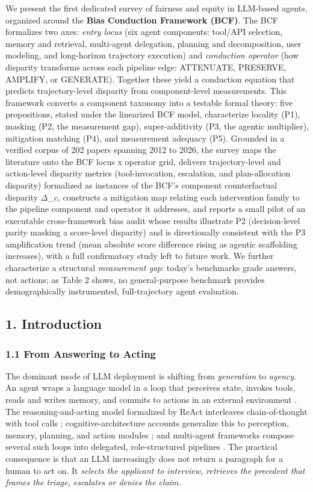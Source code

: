 \documentclass[10pt]{article}
\begin{document}
We present the first dedicated survey of fairness and equity in LLM-based agents, organized around the \textbf{Bias Conduction Framework (BCF)}. The BCF formalizes two axes: \emph{entry locus} (six agent components: tool/API selection, memory and retrieval, multi-agent delegation, planning and decomposition, user modeling, and long-horizon trajectory execution) and \emph{conduction operator} (how disparity transforms across each pipeline edge: ATTENUATE, PRESERVE, AMPLIFY, or GENERATE). Together these yield a conduction equation that predicts trajectory-level disparity from component-level measurements. This framework converts a component taxonomy into a testable formal theory: five propositions, stated under the linearized BCF model, characterize locality (P1), masking (P2, the measurement gap), super-additivity (P3, the agentic multiplier), mitigation matching (P4), and measurement adequacy (P5). Grounded in a verified corpus of 202 papers spanning 2012 to 2026, the survey maps the literature onto the BCF locus x operator grid, delivers trajectory-level and action-level disparity metrics (tool-invocation, escalation, and plan-allocation disparity) formalized as instances of the BCF's component counterfactual disparity $\Delta$\_c, constructs a mitigation map relating each intervention family to the pipeline component and operator it addresses, and reports a small pilot of an executable cross-framework bias audit whose results illustrate P2 (decision-level parity masking a score-level disparity) and is directionally consistent with the P3 amplification trend (mean absolute score difference rising as agentic scaffolding increases), with a full confirmatory study left to future work. We further characterize a structural \emph{measurement gap}: today's benchmarks grade answers, not actions; as Table 2 shows, no general-purpose benchmark provides demographically instrumented, full-trajectory agent evaluation.


\subsection*{1. Introduction}

\subsubsection*{1.1 From Answering to Acting}

The dominant mode of LLM deployment is shifting from \emph{generation} to \emph{agency}. An agent wraps a language model in a loop that perceives state, invokes tools, reads and writes memory, and commits to actions in an external environment \cite{wang2024survey,xi2023rise}. The reasoning-and-acting model formalized by ReAct interleaves chain-of-thought with tool calls \cite{yao2023react}; cognitive-architecture accounts generalize this to perception, memory, planning, and action modules \cite{sumers2024cognitive}; and multi-agent frameworks compose several such loops into delegated, role-structured pipelines \cite{wu2023autogen,park2023generative}. The practical consequence is that an LLM increasingly does not return a paragraph for a human to act on. It \emph{selects the applicant to interview, retrieves the precedent that frames the triage, escalates or denies the claim.}
\end{document}
